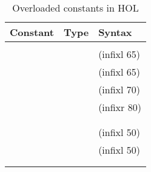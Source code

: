 \begin{isabellebody}
\begin{isamarkuptext}
\begin{table}[htbp]
\begin{center}
\begin{tabular}{lll}
Constant & Type & Syntax \\
\hline
\isa{{\isadigit{0}}} & \isa{{\isacharprime}a{\isacharcolon}{\isacharcolon}zero} \\
\isa{{\isacharplus}} & \isa{{\isacharparenleft}{\isacharprime}a{\isacharcolon}{\isacharcolon}plus{\isacharparenright}\ {\isasymRightarrow}\ {\isacharprime}a\ {\isasymRightarrow}\ {\isacharprime}a} & (infixl 65) \\
\isa{{\isacharminus}} & \isa{{\isacharparenleft}{\isacharprime}a{\isacharcolon}{\isacharcolon}minus{\isacharparenright}\ {\isasymRightarrow}\ {\isacharprime}a\ {\isasymRightarrow}\ {\isacharprime}a} &  (infixl 65) \\
\isa{{\isacharasterisk}} & \isa{{\isacharparenleft}{\isacharprime}a{\isacharcolon}{\isacharcolon}times{\isacharparenright}\ {\isasymRightarrow}\ {\isacharprime}a\ {\isasymRightarrow}\ {\isacharprime}a} & (infixl 70) \\
\isa{{\isacharcircum}} & \isa{{\isacharparenleft}{\isacharprime}a{\isacharcolon}{\isacharcolon}power{\isacharparenright}\ {\isasymRightarrow}\ nat\ {\isasymRightarrow}\ {\isacharprime}a} & (infixr 80) \\
\isa{{\isacharminus}} & \isa{{\isacharparenleft}{\isacharprime}a{\isacharcolon}{\isacharcolon}minus{\isacharparenright}\ {\isasymRightarrow}\ {\isacharprime}a} \\
\isa{abs} &  \isa{{\isacharparenleft}{\isacharprime}a{\isacharcolon}{\isacharcolon}minus{\isacharparenright}\ {\isasymRightarrow}\ {\isacharprime}a} \\
\isa{{\isasymle}} & \isa{{\isacharparenleft}{\isacharprime}a{\isacharcolon}{\isacharcolon}ord{\isacharparenright}\ {\isasymRightarrow}\ {\isacharprime}a\ {\isasymRightarrow}\ bool} & (infixl 50) \\
\isa{{\isacharless}} & \isa{{\isacharparenleft}{\isacharprime}a{\isacharcolon}{\isacharcolon}ord{\isacharparenright}\ {\isasymRightarrow}\ {\isacharprime}a\ {\isasymRightarrow}\ bool} & (infixl 50) \\
\isa{min} &  \isa{{\isacharparenleft}{\isacharprime}a{\isacharcolon}{\isacharcolon}ord{\isacharparenright}\ {\isasymRightarrow}\ {\isacharprime}a\ {\isasymRightarrow}\ {\isacharprime}a} \\
\isa{max} &  \isa{{\isacharparenleft}{\isacharprime}a{\isacharcolon}{\isacharcolon}ord{\isacharparenright}\ {\isasymRightarrow}\ {\isacharprime}a\ {\isasymRightarrow}\ {\isacharprime}a} \\
\end{tabular}
\caption{Overloaded constants in HOL}
\label{tab:overloading}
\end{center}
\end{table}%
\end{isamarkuptext}%
\end{isabellebody}%
